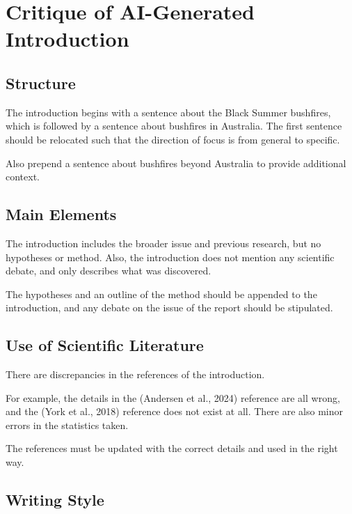 
\maketitle
\tableofcontents

\newpage

\section{Critique of AI-Generated Introduction}

\subsection{Structure}

The introduction begins with a sentence about the Black Summer bushfires, which is followed by a sentence about bushfires in Australia. The first sentence should be relocated such that the direction of focus is from general to specific.

Also prepend a sentence about bushfires beyond Australia to provide additional context.

\subsection{Main Elements}

The introduction includes the broader issue and previous research, but no hypotheses or method. Also, the introduction does not mention any scientific debate, and only describes what was discovered.

The hypotheses and an outline of the method should be appended to the introduction, and any debate on the issue of the report should be stipulated.

\subsection{Use of Scientific Literature}

There are discrepancies in the references of the introduction.

For example, the details in the (Andersen et al., 2024) reference are all wrong, and the (York et al., 2018) reference does not exist at all. There are also minor errors in the statistics taken.

The references must be updated with the correct details and used in the right way.

\subsection{Writing Style}

